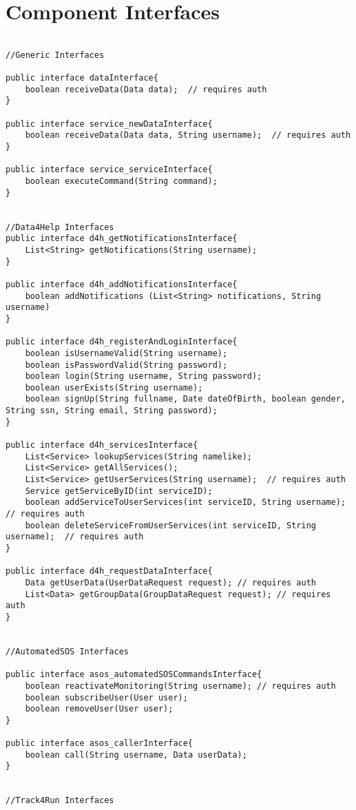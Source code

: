 \documentclass[../../DD.tex]{subfiles}
\begin{document}
\section{Component Interfaces}
\begin{lstlisting}

//Generic Interfaces

public interface dataInterface{
	boolean receiveData(Data data);  // requires auth
}

public interface service_newDataInterface{
	boolean receiveData(Data data, String username);  // requires auth
}

public interface service_serviceInterface{
	boolean executeCommand(String command);
}


//Data4Help Interfaces
public interface d4h_getNotificationsInterface{
	List<String> getNotifications(String username);
}

public interface d4h_addNotificationsInterface{
	boolean addNotifications (List<String> notifications, String username)
}

public interface d4h_registerAndLoginInterface{
	boolean isUsernameValid(String username);
	boolean isPasswordValid(String password);
	boolean login(String username, String password);
	boolean userExists(String username);
	boolean signUp(String fullname, Date dateOfBirth, boolean gender, String ssn, String email, String password);
}

public interface d4h_servicesInterface{
	List<Service> lookupServices(String namelike);
	List<Service> getAllServices();
	List<Service> getUserServices(String username);  // requires auth
	Service getServiceByID(int serviceID);
	boolean addServiceToUserServices(int serviceID, String username);  // requires auth
	boolean deleteServiceFromUserServices(int serviceID, String username);  // requires auth
}

public interface d4h_requestDataInterface{
	Data getUserData(UserDataRequest request); // requires auth
	List<Data> getGroupData(GroupDataRequest request); // requires auth
}


//AutomatedSOS Interfaces

public interface asos_automatedSOSCommandsInterface{
	boolean reactivateMonitoring(String username); // requires auth
	boolean subscribeUser(User user);
	boolean removeUser(User user);
}

public interface asos_callerInterface{
	boolean call(String username, Data userData);
}


//Track4Run Interfaces


\end{lstlisting}
\end{document}
